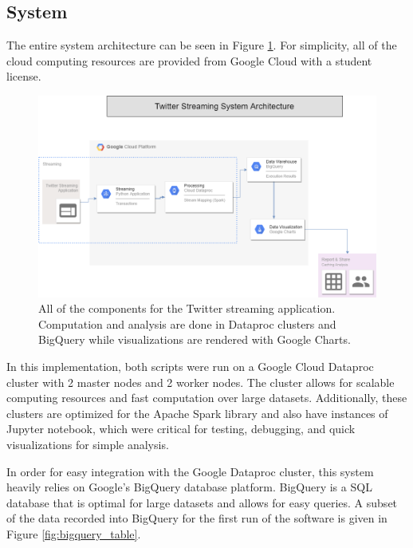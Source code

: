 \documentclass[conference]{IEEEtran}
\begin{document}
\subsection {System}

The entire system architecture can be seen in Figure \ref{fig:system_architecture}. For simplicity, all of the cloud computing resources are provided from Google Cloud with a student license.

\begin{figure}
    \centering
    \includegraphics[scale=0.25]{img/system_architecture.png}
    \caption{All of the components for the Twitter streaming application. Computation and analysis are done in Dataproc clusters and BigQuery while visualizations are rendered with Google Charts.}
    \label{fig:system_architecture}
\end{figure}

In this implementation, both scripts were run on a Google Cloud Dataproc cluster with 2 master nodes and 2 worker nodes. The cluster allows for scalable computing resources and fast computation over large datasets. Additionally, these clusters are optimized for the Apache Spark library and also have instances of Jupyter notebook, which were critical for testing, debugging, and quick visualizations for simple analysis. \par

In order for easy integration with the Google Dataproc cluster, this system heavily relies on Google's BigQuery database platform. BigQuery is a SQL database that is optimal for large datasets and allows for easy queries. A subset of the data recorded into BigQuery for the first run of the software is given in Figure \ref{fig:bigquery_table}. \par
\end{document}
